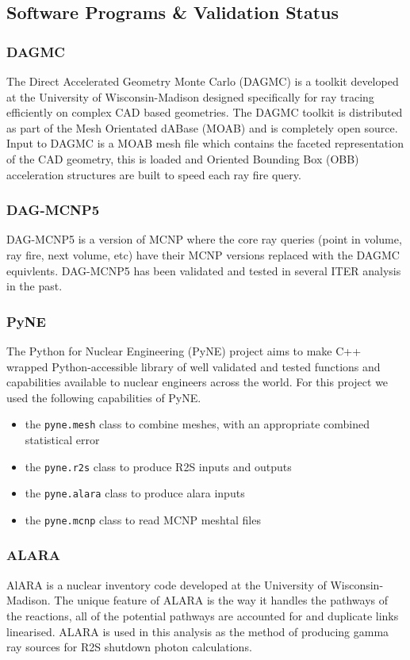 \documentclass[12pt]{article}
\begin{document}
\newpage
\subsection{Software Programs \& Validation Status}
\subsubsection{DAGMC}
The Direct Accelerated Geometry Monte Carlo (DAGMC) is a toolkit developed at
the University of Wisconsin-Madison designed specifically for ray tracing
efficiently on complex CAD based geometries. The DAGMC toolkit is distributed as
part of the Mesh Orientated dABase (MOAB) and is completely open source. Input
to DAGMC is a MOAB mesh file which contains the faceted representation of the
CAD geometry, this is loaded and Oriented Bounding Box (OBB) acceleration
structures are built to speed each ray fire query.
\subsubsection{DAG-MCNP5}
DAG-MCNP5 \cite{dagmc} is a version of MCNP \cite{mcnp} where the core ray
queries (point in volume, ray fire, next volume, etc) have their MCNP versions
replaced with the DAGMC equivlents. DAG-MCNP5 has been validated
\cite{dagmc_validation} and tested in several ITER analysis in the past.
\subsubsection{PyNE}
The Python for Nuclear Engineering (PyNE) \cite{Scopatz2012b} project aims to
make C++ wrapped Python-accessible library of well validated and tested
functions and capabilities available to nuclear engineers across the world.
For this project we used the following capabilities of PyNE.
\begin{itemize}
  \item{the \texttt{pyne.mesh} class to combine meshes, with an appropriate
        combined statistical error}
  \item{the \texttt{pyne.r2s} class to produce R2S inputs and outputs}
  \item{the \texttt{pyne.alara} class to produce alara inputs}
  \item{the \texttt{pyne.mcnp} class to read MCNP meshtal files}
\end{itemize}
\subsubsection{ALARA}
AlARA \cite{alara} is a nuclear inventory code developed at the University of
Wisconsin-Madison. The unique feature of ALARA is the way it handles the
pathways of the reactions, all of the potential pathways are accounted for and
duplicate links linearised. ALARA is used in this analysis as the method of
producing gamma ray sources for R2S shutdown photon calculations.
\end{document}
